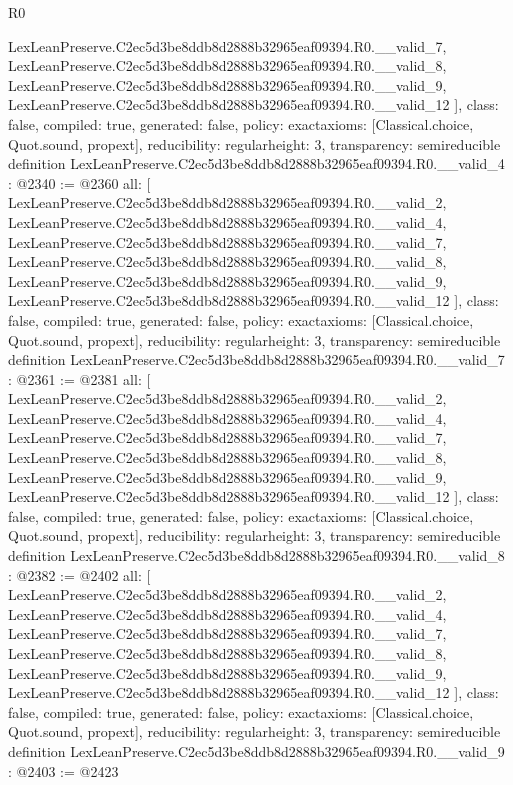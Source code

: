 \begin{lexlean}{R0}
\begin{coremodule}
{    LexLeanPreserve.C2ec5d3be8ddb8d2888b32965eaf09394.R0.__valid_7,
    LexLeanPreserve.C2ec5d3be8ddb8d2888b32965eaf09394.R0.__valid_8,
    LexLeanPreserve.C2ec5d3be8ddb8d2888b32965eaf09394.R0.__valid_9,
    LexLeanPreserve.C2ec5d3be8ddb8d2888b32965eaf09394.R0.__valid_12
  ],
  class: false,
  compiled: true,
  generated: false,
  policy: exact{axioms: [Classical.choice, Quot.sound, propext]},
  reducibility: regular{height: 3},
  transparency: semireducible
}
definition LexLeanPreserve.C2ec5d3be8ddb8d2888b32965eaf09394.R0.__valid_4 : @2340 := @2360 {
  all: [
    LexLeanPreserve.C2ec5d3be8ddb8d2888b32965eaf09394.R0.__valid_2,
    LexLeanPreserve.C2ec5d3be8ddb8d2888b32965eaf09394.R0.__valid_4,
    LexLeanPreserve.C2ec5d3be8ddb8d2888b32965eaf09394.R0.__valid_7,
    LexLeanPreserve.C2ec5d3be8ddb8d2888b32965eaf09394.R0.__valid_8,
    LexLeanPreserve.C2ec5d3be8ddb8d2888b32965eaf09394.R0.__valid_9,
    LexLeanPreserve.C2ec5d3be8ddb8d2888b32965eaf09394.R0.__valid_12
  ],
  class: false,
  compiled: true,
  generated: false,
  policy: exact{axioms: [Classical.choice, Quot.sound, propext]},
  reducibility: regular{height: 3},
  transparency: semireducible
}
definition LexLeanPreserve.C2ec5d3be8ddb8d2888b32965eaf09394.R0.__valid_7 : @2361 := @2381 {
  all: [
    LexLeanPreserve.C2ec5d3be8ddb8d2888b32965eaf09394.R0.__valid_2,
    LexLeanPreserve.C2ec5d3be8ddb8d2888b32965eaf09394.R0.__valid_4,
    LexLeanPreserve.C2ec5d3be8ddb8d2888b32965eaf09394.R0.__valid_7,
    LexLeanPreserve.C2ec5d3be8ddb8d2888b32965eaf09394.R0.__valid_8,
    LexLeanPreserve.C2ec5d3be8ddb8d2888b32965eaf09394.R0.__valid_9,
    LexLeanPreserve.C2ec5d3be8ddb8d2888b32965eaf09394.R0.__valid_12
  ],
  class: false,
  compiled: true,
  generated: false,
  policy: exact{axioms: [Classical.choice, Quot.sound, propext]},
  reducibility: regular{height: 3},
  transparency: semireducible
}
definition LexLeanPreserve.C2ec5d3be8ddb8d2888b32965eaf09394.R0.__valid_8 : @2382 := @2402 {
  all: [
    LexLeanPreserve.C2ec5d3be8ddb8d2888b32965eaf09394.R0.__valid_2,
    LexLeanPreserve.C2ec5d3be8ddb8d2888b32965eaf09394.R0.__valid_4,
    LexLeanPreserve.C2ec5d3be8ddb8d2888b32965eaf09394.R0.__valid_7,
    LexLeanPreserve.C2ec5d3be8ddb8d2888b32965eaf09394.R0.__valid_8,
    LexLeanPreserve.C2ec5d3be8ddb8d2888b32965eaf09394.R0.__valid_9,
    LexLeanPreserve.C2ec5d3be8ddb8d2888b32965eaf09394.R0.__valid_12
  ],
  class: false,
  compiled: true,
  generated: false,
  policy: exact{axioms: [Classical.choice, Quot.sound, propext]},
  reducibility: regular{height: 3},
  transparency: semireducible
}
definition LexLeanPreserve.C2ec5d3be8ddb8d2888b32965eaf09394.R0.__valid_9 : @2403 := @2423 {
}
\end{coremodule}
\end{lexlean}
